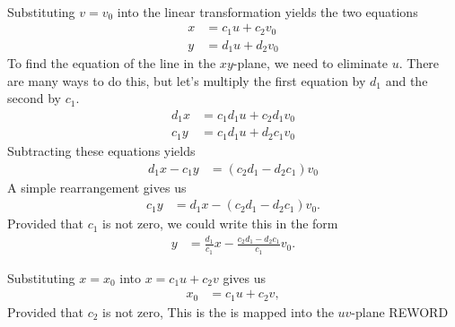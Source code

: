 \documentclass{article}
\begin{document}
\BEN
\item %
 \\
\BEN
\item Substituting $v = v_0$ into the linear transformation yields the two equations
\begin{align*}
  x &= c_1u + c_2v_0 \\ 
  y &= d_1u + d_2v_0
\end{align*}
To find the equation of the line in the $xy$-plane, we need to eliminate $u$. There are many ways to do this, but let's multiply the first equation by $d_1$ and the second by $c_1$.
\begin{align*}
  d_1x &= c_1d_1u + c_2d_1v_0 \\ 
  c_1y &= c_1d_1u + d_2c_1v_0
\end{align*}
Subtracting these equations yields
\begin{align*}
  d_1x -  c_1y &=  (c_2d_1 -  d_2c_1)v_0 
\end{align*}
A simple rearrangement gives us
\begin{align*}
  c_1y &= d_1x - (c_2d_1 -  d_2c_1)v_0 .
\end{align*}
Provided that $c_1$ is not zero, we could write this in the form
\begin{align*}
  y &= \frac{d_1}{c_1}x - \frac{c_2d_1 -  d_2c_1}{c_1}v_0 .
\end{align*}
\item Substituting $x=x_0$ into $x =c_1u + c_2v$ gives us 
\begin{align*}
  x_0 &= c_1u + c_2v,
\end{align*}
Provided that $c_2$ is not zero, 
This is the is mapped into the $uv$-plane REWORD
\EEN
\end{document}

